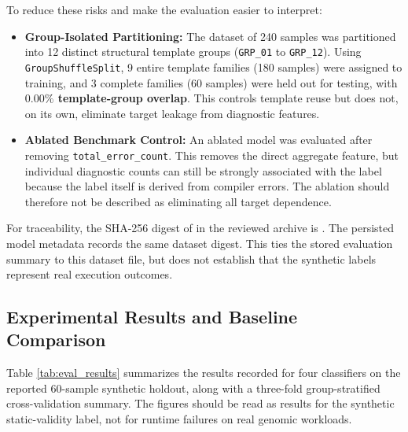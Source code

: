 \documentclass[12pt,a4paper]{article}
\begin{document}
To reduce these risks and make the evaluation easier to interpret:
\begin{itemize}
    \item \textbf{Group-Isolated Partitioning:} The dataset of 240 samples was partitioned into 12 distinct structural template groups (\texttt{GRP\_01} to \texttt{GRP\_12}). Using \texttt{GroupShuffleSplit}, 9 entire template families (180 samples) were assigned to training, and 3 complete families (60 samples) were held out for testing, with \textbf{$0.00\%$ template-group overlap}. This controls template reuse but does not, on its own, eliminate target leakage from diagnostic features.
    \item \textbf{Ablated Benchmark Control:} An ablated model was evaluated after removing \texttt{total\_error\_count}. This removes the direct aggregate feature, but individual diagnostic counts can still be strongly associated with the label because the label itself is derived from compiler errors. The ablation should therefore not be described as eliminating all target dependence.
\end{itemize}

For traceability, the SHA-256 digest of  in the reviewed archive is \texttt{}. The persisted model metadata records the same dataset digest. This ties the stored evaluation summary to this dataset file, but does not establish that the synthetic labels represent real execution outcomes.

\subsection{Experimental Results and Baseline Comparison}

Table \ref{tab:eval_results} summarizes the results recorded for four classifiers on the reported 60-sample synthetic holdout, along with a three-fold group-stratified cross-validation summary. The figures should be read as results for the synthetic static-validity label, not for runtime failures on real genomic workloads.
\end{document}
